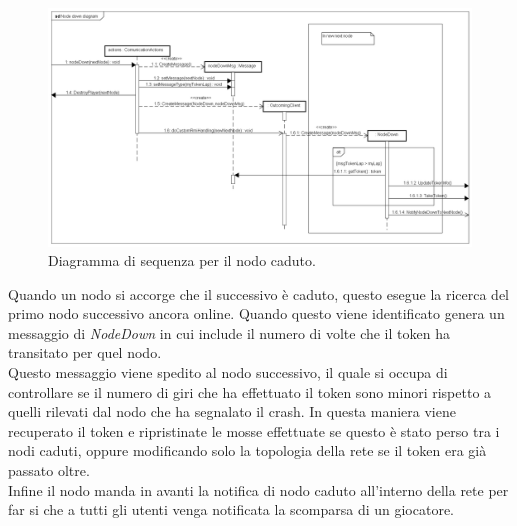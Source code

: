 \documentclass{llncs}
\begin{document}
\begin{figure}[H]
\centering
    \includegraphics[width=12cm]{imgs/Node-down-diagram.png}
     \caption{Diagramma di sequenza per il nodo caduto.}
   \label{output:blacknoxis_normal}
\end{figure}
Quando un nodo si accorge che il successivo è caduto, questo esegue la ricerca del primo nodo successivo ancora online. Quando questo viene identificato genera un messaggio di \emph{NodeDown} in cui include il numero di volte che il token ha transitato per quel nodo.\\
Questo messaggio viene spedito al nodo successivo, il quale si occupa di controllare se il numero di giri che ha effettuato il token sono minori rispetto a quelli rilevati dal nodo che ha segnalato il crash. In questa maniera viene recuperato il token e ripristinate le mosse effettuate se questo è stato perso tra i nodi caduti, oppure modificando solo la topologia della rete se il token era già passato oltre.\\
Infine il nodo manda in avanti la notifica di nodo caduto all'interno della rete per far si che a tutti gli utenti venga notificata la scomparsa di un giocatore.\\
\end{document}
